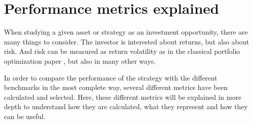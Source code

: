 \section{Performance metrics explained}
When studying a given asset or strategy as an investment opportunity, there are many things to consider. The investor is interested about returns, but also about risk. And risk can be measured as return volatility as in the classical portfolio optimization paper \cite{markowitz_1952}, but also in many other ways. 

In order to compare the performance of the strategy with the different benchmarks in the most complete way, several different metrics have been calculated and selected. Here, these different metrics will be explained in more depth to understand how they are calculated, what they represent and how they can be useful. 

